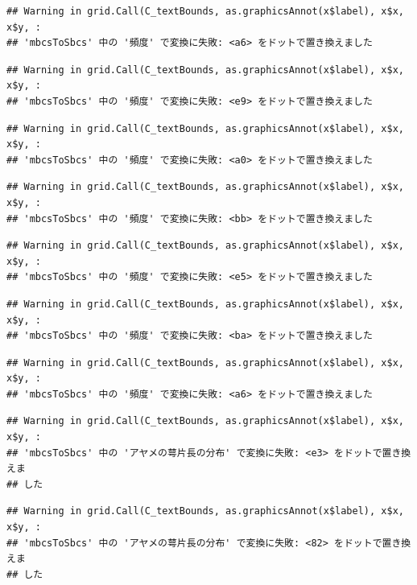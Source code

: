 \documentclass[
]{book}
\begin{document}
\begin{verbatim}
## Warning in grid.Call(C_textBounds, as.graphicsAnnot(x$label), x$x, x$y, :
## 'mbcsToSbcs' 中の '頻度' で変換に失敗: <a6> をドットで置き換えました
\end{verbatim}

\begin{verbatim}
## Warning in grid.Call(C_textBounds, as.graphicsAnnot(x$label), x$x, x$y, :
## 'mbcsToSbcs' 中の '頻度' で変換に失敗: <e9> をドットで置き換えました
\end{verbatim}

\begin{verbatim}
## Warning in grid.Call(C_textBounds, as.graphicsAnnot(x$label), x$x, x$y, :
## 'mbcsToSbcs' 中の '頻度' で変換に失敗: <a0> をドットで置き換えました
\end{verbatim}

\begin{verbatim}
## Warning in grid.Call(C_textBounds, as.graphicsAnnot(x$label), x$x, x$y, :
## 'mbcsToSbcs' 中の '頻度' で変換に失敗: <bb> をドットで置き換えました
\end{verbatim}

\begin{verbatim}
## Warning in grid.Call(C_textBounds, as.graphicsAnnot(x$label), x$x, x$y, :
## 'mbcsToSbcs' 中の '頻度' で変換に失敗: <e5> をドットで置き換えました
\end{verbatim}

\begin{verbatim}
## Warning in grid.Call(C_textBounds, as.graphicsAnnot(x$label), x$x, x$y, :
## 'mbcsToSbcs' 中の '頻度' で変換に失敗: <ba> をドットで置き換えました
\end{verbatim}

\begin{verbatim}
## Warning in grid.Call(C_textBounds, as.graphicsAnnot(x$label), x$x, x$y, :
## 'mbcsToSbcs' 中の '頻度' で変換に失敗: <a6> をドットで置き換えました
\end{verbatim}

\begin{verbatim}
## Warning in grid.Call(C_textBounds, as.graphicsAnnot(x$label), x$x, x$y, :
## 'mbcsToSbcs' 中の 'アヤメの萼片長の分布' で変換に失敗: <e3> をドットで置き換えま
## した
\end{verbatim}

\begin{verbatim}
## Warning in grid.Call(C_textBounds, as.graphicsAnnot(x$label), x$x, x$y, :
## 'mbcsToSbcs' 中の 'アヤメの萼片長の分布' で変換に失敗: <82> をドットで置き換えま
## した
\end{verbatim}
\end{document}
